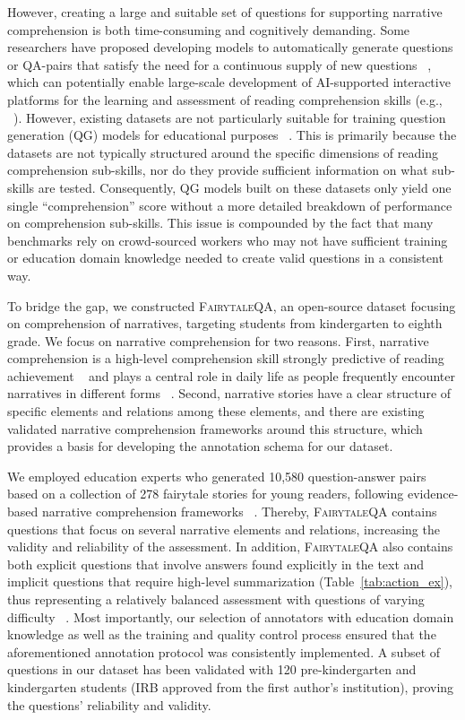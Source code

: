 \documentclass[11pt]{article}
\newcommand{\datasetname}{\textsc{FairytaleQA}\xspace}
\begin{document}
However, creating a large and suitable set of questions for supporting narrative comprehension is both time-consuming and cognitively demanding. Some researchers have proposed developing models to automatically generate questions or QA-pairs that satisfy the need for a continuous supply of new questions ~\cite{kurdi2020systematic, yao2022storybookqag}, which can potentially enable large-scale development of AI-supported interactive platforms for the learning and assessment of reading comprehension skills (e.g., ~\cite{zhang_storybuddy:_2022}). However, existing datasets are not particularly suitable for training question generation (QG) models for educational purposes ~\cite{das2021automatic}. This is primarily because the datasets are not typically structured around the specific dimensions of reading comprehension sub-skills, nor do they provide sufficient information on what sub-skills are tested. Consequently, QG models built on these datasets only yield one single ``comprehension'' score without a more detailed breakdown of performance on comprehension sub-skills. This issue is compounded by the fact that many benchmarks rely on crowd-sourced workers who may not have sufficient training or education domain knowledge needed to create valid questions in a consistent way. 

To bridge the gap, we constructed  \datasetname, an open-source dataset focusing on comprehension of narratives, targeting students from kindergarten to eighth grade. We focus on narrative comprehension for two reasons. First, narrative comprehension is a high-level comprehension skill strongly predictive of reading achievement ~\cite{lynch2008development} and plays a central role in daily life as people frequently encounter narratives in different forms ~\cite{goldie2003one}. Second, narrative stories have a clear structure of specific elements and relations among these elements, and there are existing validated narrative comprehension frameworks around this structure, which provides a basis for developing the annotation schema for our dataset.

We employed education experts who generated 10,580 question-answer pairs based on a collection of 278 fairytale stories for young readers, following evidence-based narrative comprehension frameworks ~\cite{paris2003assessing, alonzo2009they}. Thereby, \datasetname contains questions that focus on several narrative elements and relations, increasing the validity and reliability of the assessment. In addition, \datasetname also contains both explicit questions that involve answers found explicitly in the text and implicit questions that require high-level summarization (Table~\ref{tab:action_ex}), thus representing a relatively balanced assessment with questions of varying difficulty ~\cite{zucker2010preschool,raphael1986teaching}. Most importantly, our selection of annotators with education domain knowledge as well as the training and quality control process ensured that the aforementioned annotation protocol was consistently implemented. A subset of questions in our dataset has been validated with 120 pre-kindergarten and kindergarten students (IRB approved from the first author's institution), proving the questions' reliability and validity.  
\end{document}
